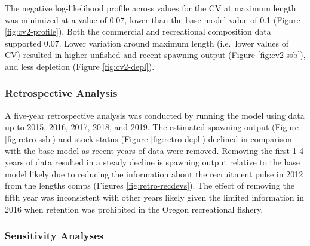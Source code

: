 \documentclass[11pt,
  english,
  a4paper,
]{article}
\begin{document}
The negative log-likelihood profile across values for the CV at maximum length was minimized at a value of 0.07, lower than the base model value of 0.1 (Figure \ref{fig:cv2-profile}). Both the commercial and recreational composition data supported 0.07. Lower variation around maximum length (i.e.~lower values of CV) resulted in higher unfished and recent spawning output (Figure \ref{fig:cv2-ssb}), and less depletion (Figure \ref{fig:cv2-depl}).

\leavevmode\tagmcend\tagstructend\par


\hypertarget{retrospective-analysis}{%
\subsubsection{Retrospective Analysis}\label{retrospective-analysis}}

\leavevmode\tagmcend\tagstructend


A five-year retrospective analysis was conducted by running the model using data up to 2015, 2016, 2017, 2018, and 2019. The estimated spawning output (Figure \ref{fig:retro-ssb}) and stock status (Figure \ref{fig:retro-depl}) declined in comparison with the base model as recent years of data were removed. Removing the first 1-4 years of data resulted in a steady decline is spawning output relative to the base model likely due to reducing the information about the recruitment pulse in 2012 from the lengths comps (Figures \ref{fig:retro-recdevs}). The effect of removing the fifth year was inconsistent with other years likely given the limited information in 2016 when retention was prohibited in the Oregon recreational fishery.

\leavevmode\tagmcend\tagstructend\par


\hypertarget{sensitivity-analyses}{%
\subsubsection{Sensitivity Analyses}\label{sensitivity-analyses}}

\leavevmode\tagmcend\tagstructend

\end{document}
